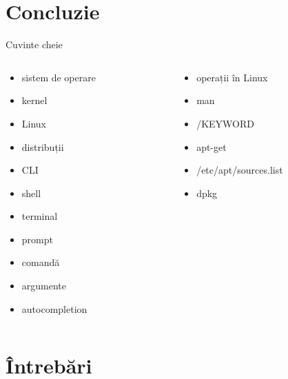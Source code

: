 \documentclass{beamer}
\begin{document}
\section{Concluzie}

\begin{frame}{Cuvinte cheie}
  \begin{columns}
    \begin{column}[l]{0.5\textwidth}
      \begin{itemize}
        \item sistem de operare
        \item kernel
        \item Linux
        \item distribuții
        \item CLI
        \item shell
        \item terminal
        \item prompt
        \item comandă
        \item argumente
        \item autocompletion
      \end{itemize}
    \end{column}
    \begin{column}[l]{0.5\textwidth}
      \begin{itemize}
        \item operații în Linux
        \item man
        \item /KEYWORD
        \item apt-get
        \item /etc/apt/sources.list
        \item dpkg
      \end{itemize}
    \end{column}
  \end{columns}
\end{frame}


\section{Întrebări}
\end{document}
